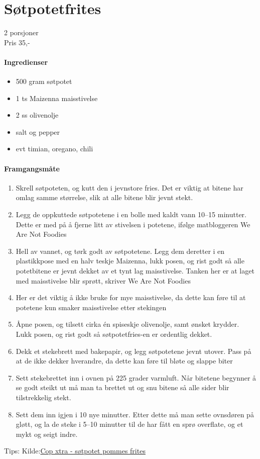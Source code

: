 \section{﻿Søtpotetfrites}
\label{frites}

2 porsjoner\\
Pris 35,-

\paragraph{Ingredienser}
\begin{itemize}[noitemsep]
	\item 500 gram søtpotet
	\item 1 ts Maizenna maisstivelse
	\item 2 ss olivenolje
	\item salt og pepper
	\item evt timian, oregano, chili
\end{itemize}

\paragraph{Framgangsmåte}
\begin{enumerate}[noitemsep]
	\item Skrell søtpoteten, og kutt den i jevnstore fries. Det er viktig at bitene har omlag samme størrelse, slik at alle bitene blir jevnt stekt.
	\item Legg de oppkuttede søtpotetene i en bolle med kaldt vann 10--15 minutter. Dette er med på å fjerne litt av stivelsen i potetene, ifølge matbloggeren We Are Not Foodies
	\item Hell av vannet, og tørk godt av søtpotetene. Legg dem deretter i en plastikkpose med en halv teskje Maizenna, lukk posen, og rist godt så alle potetbitene er jevnt dekket av et tynt lag maisstivelse. Tanken her er at laget med maisstivelse blir sprøtt, skriver We Are Not Foodies
	\item Her er det viktig å ikke bruke for mye maisstivelse, da dette kan føre til at potetene kun smaker maisstivelse etter stekingen
	\item Åpne posen, og tilsett cirka én spiseskje olivenolje, samt ønsket krydder. Lukk posen, og rist godt så søtpotetfries-en er ordentlig dekket.
	\item Dekk et stekebrett med bakepapir, og legg søtpotetene jevnt utover. Pass på at de ikke dekker hverandre, da dette kan føre til bløte og slappe biter
	\item Sett stekebrettet inn i ovnen på 225 grader varmluft. Når bitetene begynner å se godt steikt ut må man ta brettet ut og snu bitene så alle sider blir tilstrekkelig stekt.
	\item Sett dem inn igjen i 10 nye minutter. Etter dette må man sette ovnsdøren på gløtt, og la de steke i 5--10 minutter til de har fått en sprø overflate, og et mykt og seigt indre.

\end{enumerate}

Tips:
Kilde:\href{https://coop.no/extra/mat--trender/garantert-spro-sotpotetfries/}{Cop xtra - søtpotet pommes frites}
